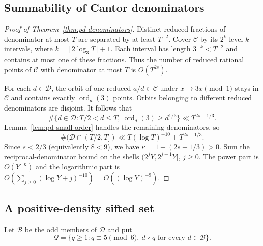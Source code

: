 \subsection{Summability of Cantor denominators}

\begin{proof}[Proof of Theorem~\ref{thm:pd-denominators}]
Distinct reduced fractions of denominator at most $T$ are separated by
at least $T^{-2}$. Cover $\mathcal C$ by its $2^k$ level-$k$ intervals,
where $k=\lfloor2\log_3T\rfloor+1$. Each interval has length
$3^{-k}<T^{-2}$ and contains at most one of these fractions. Thus the
number of reduced rational points of $\mathcal C$ with denominator at
most $T$ is $O(T^{2s})$.

For each $d\in\mathscr D$, the orbit of one reduced $a/d\in\mathcal C$
under $x\mapsto3x\pmod1$ stays in $\mathcal C$ and contains exactly
$\operatorname{ord}_d(3)$ points. Orbits belonging to different
reduced denominators are disjoint. It follows that
\[
 \#\{d\in\mathscr D:T/2<d\leq T,
                       \ \operatorname{ord}_d(3)\geq d^{1/3}\}
       \ll T^{2s-1/3}.
\]
Lemma~\ref{lem:pd-small-order} handles the remaining denominators,
so
\[
 \#(\mathscr D\cap(T/2,T])
       \ll T(\log T)^{-10}+T^{2s-1/3}.
\]
Since $s<2/3$ (equivalently $8<9$), we have
$\kappa=1-(2s-1/3)>0$. Sum the reciprocal-denominator bound on
the shells $(2^jY,2^{j+1}Y]$, $j\geq0$. The power part is
$O(Y^{-\kappa})$ and the logarithmic part is
$O(\sum_{j\geq0}(\log Y+j)^{-10})=O((\log Y)^{-9})$.
\end{proof}

\subsection{A positive-density sifted set}

Let $\mathscr B$ be the odd members of $\mathscr D$ and put
\[
 \mathcal Q=\{q\geq1:q\equiv5\pmod6,
                   \ d\nmid q\text{ for every }d\in\mathscr B\}.
\]

